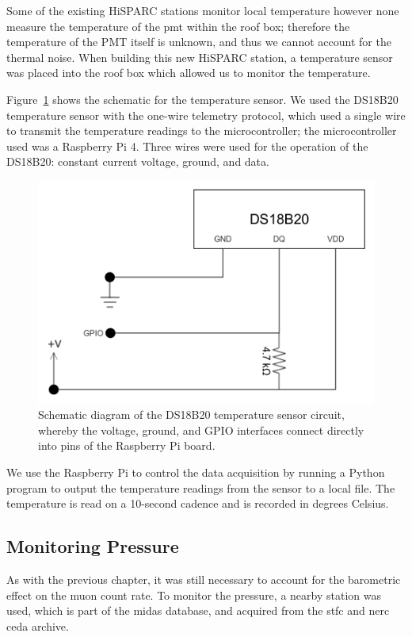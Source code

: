 Some of the existing HiSPARC stations monitor local temperature however none measure the temperature of the \gls{pmt} within the roof box; therefore the temperature of the PMT itself is unknown, and thus we cannot account for the thermal noise. When building this new HiSPARC station, a temperature sensor was placed into the roof box which allowed us to monitor the temperature.

Figure~\ref{fig:temperature_sensor_circuit} shows the schematic for the temperature sensor. We used the DS18B20 temperature sensor with the one-wire telemetry protocol, which used a single wire to transmit the temperature readings to the microcontroller; the microcontroller used was a Raspberry Pi 4. Three wires were used for the operation of the DS18B20: constant current voltage, ground, and data.

\begin{figure}
	\centering
	\includegraphics[width=0.6\columnwidth]{HS_14008_temp_circuit.png}
	\caption{Schematic diagram of the DS18B20 temperature sensor circuit, whereby the voltage, ground, and GPIO interfaces connect directly into pins of the Raspberry Pi board.}
	\label{fig:temperature_sensor_circuit}
\end{figure}

We use the Raspberry Pi to control the data acquisition by running a Python program to output the temperature readings from the sensor to a local file. The temperature is read on a 10-second cadence and is recorded in degrees Celsius.



\subsection{Monitoring Pressure}

As with the previous chapter, it was still necessary to account for the barometric effect on the muon count rate. To monitor the pressure, a nearby station was used, which is part of the \gls{midas} database, and acquired from the \gls{stfc} and \gls{nerc} \gls{ceda} archive.

